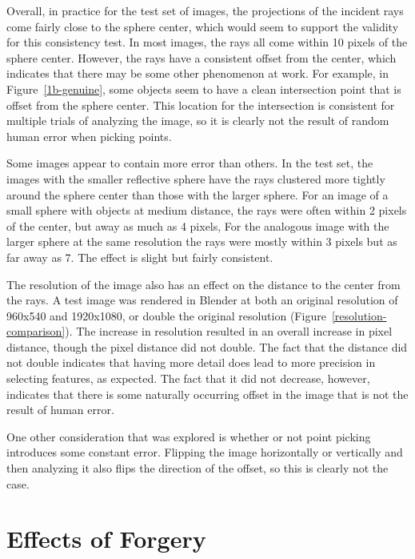 \documentclass{thesis}
\begin{document}
Overall, in practice for the test set of images, the projections of the incident rays come fairly close to the sphere center, which would seem to support the validity for this consistency test. In most images, the rays all come within 10 pixels of the sphere center. However, the rays have a consistent offset from the center, which indicates that there may be some other phenomenon at work. For example, in Figure~\ref{1b-genuine}, some objects seem to have a clean intersection point that is offset from the sphere center. This location for the intersection is consistent for multiple trials of analyzing the image, so it is clearly not the result of random human error when picking points.

Some images appear to contain more error than others. In the test set, the images with the smaller reflective sphere have the rays clustered more tightly around the sphere center than those with the larger sphere. For an image of a small sphere with objects at medium distance, the rays were often within 2 pixels of the center, but away as much as 4 pixels, For the analogous image with the larger sphere at the same resolution the rays were mostly within 3 pixels but as far away as 7. The effect is slight but fairly consistent.

The resolution of the image also has an effect on the distance to the center from the rays. A test image was rendered in Blender at both an original resolution of 960x540 and 1920x1080, or double the original resolution (Figure~\ref{resolution-comparison}). The increase in resolution resulted in an overall increase in pixel distance, though the pixel distance did not double. The fact that the distance did not double indicates that having more detail does lead to more precision in selecting features, as expected. The fact that it did not decrease, however, indicates that there is some naturally occurring offset in the image that is not the result of human error.

One other consideration that was explored is whether or not point picking introduces some constant error. Flipping the image horizontally or vertically and then analyzing it also flips the direction of the offset, so this is clearly not the case.


\section{Effects of Forgery}
\end{document}
